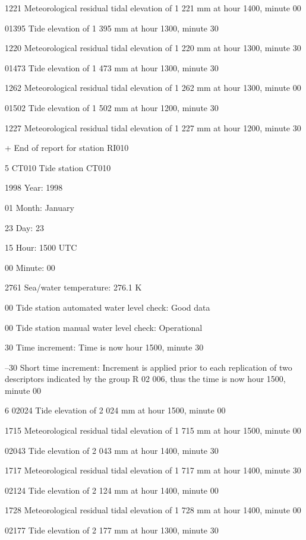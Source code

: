 1221 Meteorological residual tidal elevation of 1 221 mm at hour 1400, minute 00

01395 Tide elevation of 1 395 mm at hour 1300, minute 30

1220 Meteorological residual tidal elevation of 1 220 mm at hour 1300, minute 30

01473 Tide elevation of 1 473 mm at hour 1300, minute 30

1262 Meteorological residual tidal elevation of 1 262 mm at hour 1300, minute 00

01502 Tide elevation of 1 502 mm at hour 1200, minute 30

1227 Meteorological residual tidal elevation of 1 227 mm at hour 1200, minute 30

+ End of report for station RI010

5 CT010 Tide station CT010

1998 Year: 1998

01 Month: January

23 Day: 23

15 Hour: 1500 UTC

00 Minute: 00

2761 Sea/water temperature: 276.1 K

00 Tide station automated water level check: Good data

00 Tide station manual water level check: Operational

30 Time increment: Time is now hour 1500, minute 30

--30 Short time increment: Increment is applied prior to each replication of two\\
descriptors indicated by the group R 02 006, thus the time is now hour 1500,\\
minute 00

6 02024 Tide elevation of 2 024 mm at hour 1500, minute 00

1715 Meteorological residual tidal elevation of 1 715 mm at hour 1500, minute 00

02043 Tide elevation of 2 043 mm at hour 1400, minute 30

1717 Meteorological residual tidal elevation of 1 717 mm at hour 1400, minute 30

02124 Tide elevation of 2 124 mm at hour 1400, minute 00

1728 Meteorological residual tidal elevation of 1 728 mm at hour 1400, minute 00

02177 Tide elevation of 2 177 mm at hour 1300, minute 30

